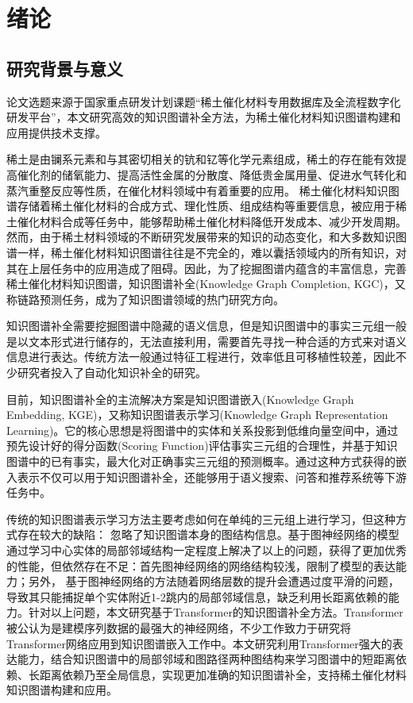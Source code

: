 \chapter{绪论}

\section{研究背景与意义}
论文选题来源于国家重点研发计划课题“稀土催化材料专用数据库及全流程数字化研发平台”，本文研究高效的知识图谱补全方法，为稀土催化材料知识图谱构建和应用提供技术支撑。

稀土是由镧系元素和与其密切相关的钪和钇等化学元素组成，稀土的存在能有效提高催化剂的储氧能力、提高活性金属的分散度、降低贵金属用量、促进水气转化和蒸汽重整反应等性质，在催化材料领域中有着重要的应用。
稀土催化材料知识图谱存储着稀土催化材料的合成方式、理化性质、组成结构等重要信息，被应用于稀土催化材料合成等任务中，能够帮助稀土催化材料降低开发成本、减少开发周期。然而，由于稀土材料领域的不断研究发展带来的知识的动态变化，和大多数知识图谱一样，稀土催化材料知识图谱往往是不完全的，难以囊括领域内的所有知识，对其在上层任务中的应用造成了阻碍。因此，为了挖掘图谱内蕴含的丰富信息，完善稀土催化材料知识图谱，知识图谱补全(Knowledge Graph Completion, KGC)，又称链路预测任务，成为了知识图谱领域的热门研究方向。

知识图谱补全需要挖掘图谱中隐藏的语义信息，但是知识图谱中的事实三元组一般是以文本形式进行储存的，无法直接利用，需要首先寻找一种合适的方式来对语义信息进行表达。传统方法一般通过特征工程进行，效率低且可移植性较差，因此不少研究者投入了自动化知识补全的研究。

目前，知识图谱补全的主流解决方案是知识图谱嵌入(Knowledge Graph Embedding, KGE)，又称知识图谱表示学习(Knowledge Graph Representation Learning)。它的核心思想是将图谱中的实体和关系投影到低维向量空间中，通过预先设计好的得分函数(Scoring Function)评估事实三元组的合理性，并基于知识图谱中的已有事实，最大化对正确事实三元组的预测概率。通过这种方式获得的嵌入表示不仅可以用于知识图谱补全，还能够用于语义搜索、问答和推荐系统等下游任务中。

传统的知识图谱表示学习方法主要考虑如何在单纯的三元组上进行学习，但这种方式存在较大的缺陷：
忽略了知识图谱本身的图结构信息。基于图神经网络的模型通过学习中心实体的局部邻域结构一定程度上解决了以上的问题，获得了更加优秀的性能，但依然存在不足：首先图神经网络的网络结构较浅，限制了模型的表达能力；另外，
基于图神经网络的方法随着网络层数的提升会遭遇过度平滑的问题，导致其只能捕捉单个实体附近1-2跳内的局部邻域信息，缺乏利用长距离依赖的能力。针对以上问题，本文研究基于Transformer的知识图谱补全方法。Transformer被公认为是建模序列数据的最强大的神经网络，不少工作致力于研究将Transformer网络应用到知识图谱嵌入工作中。本文研究利用Transformer强大的表达能力，结合知识图谱中的局部邻域和图路径两种图结构来学习图谱中的短距离依赖、长距离依赖乃至全局信息，实现更加准确的知识图谱补全，支持稀土催化材料知识图谱构建和应用。


